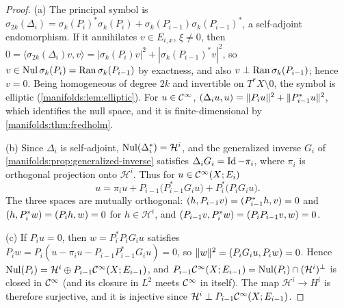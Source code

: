 \begin{proof}
(a) The principal symbol is
$\sigma_{2k}(\Delta_i)=\sigma_k(P_i)^*\sigma_k(P_i)+\sigma_k(P_{i-1})\sigma_k(P_{i-1})^*$, a
self-adjoint endomorphism. If it annihilates $v\in E_{i,x}$, $\xi\ne0$, then
$0=\langle\sigma_{2k}(\Delta_i)v,v\rangle=|\sigma_k(P_i)v|^2+|\sigma_k(P_{i-1})^*v|^2$, so
$v\in\operatorname{Nul}\sigma_k(P_i)=\operatorname{Ran}\sigma_k(P_{i-1})$ by exactness, and also $v\perp\operatorname{Ran}\sigma_k(P_{i-1})$;
hence $v=0$. Being homogeneous of degree $2k$ and invertible on $T^*X\setminus0$, the
symbol is elliptic (\cref{manifolds:lem:elliptic}). For $u\in\mathcal{C}^\infty$,
$( \Delta_iu, u)=\|P_iu\|^2+\|P_{i-1}^*u\|^2$, which identifies the null space, and it
is finite-dimensional by \cref{manifolds:thm:fredholm}.

(b) Since $\Delta_i$ is self-adjoint, $\operatorname{Nul}(\Delta_i^*)=\mathcal H^i$, and the generalized
inverse $G_i$ of \cref{manifolds:prop:generalized-inverse} satisfies
$\Delta_iG_i=\operatorname{Id}-\pi_i$, where $\pi_i$ is orthogonal projection onto $\mathcal H^i$. Thus for
$u\in\mathcal{C}^\infty(X;E_i)$
\begin{equation*}
u=\pi_iu+P_{i-1}\big(P_{i-1}^*G_iu\big)+P_i^*\big(P_iG_iu\big).
\end{equation*}
The three spaces are mutually orthogonal: $( h, P_{i-1}v)=( P_{i-1}^*h, v)=0$ and
$( h, P_i^*w)=( P_ih, w)=0$ for $h\in\mathcal H^i$, and
$( P_{i-1}v, P_i^*w)=( P_iP_{i-1}v, w)=0$.

(c) If $P_iu=0$, then $w=P_i^*P_iG_iu$ satisfies $P_iw=P_i(u-\pi_iu-P_{i-1}P_{i-1}^*G_iu)=0$,
so $\|w\|^2=( P_iG_iu, P_iw)=0$. Hence $\operatorname{Nul}(P_i)=\mathcal H^i\oplus P_{i-1}\mathcal{C}^\infty(X;E_{i-1})$,
and $P_{i-1}\mathcal{C}^\infty(X;E_{i-1})=\operatorname{Nul}(P_i)\cap(\mathcal H^i)^\perp$ is closed in $\mathcal{C}^\infty$ (and its closure in
$L^2$ meets $\mathcal{C}^\infty$ in itself). The map $\mathcal H^i\to H^i$ is therefore surjective, and it is
injective since $\mathcal H^i\perp P_{i-1}\mathcal{C}^\infty(X;E_{i-1})$.
\end{proof}

